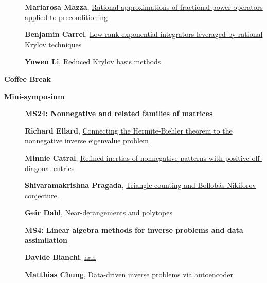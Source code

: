 \documentclass[ILAS2025-program.tex]{subfiles}
\begin{document}
\begin{description}
\begin{description}
        \item[] \hypertarget{up0194}{}\textbf{Mariarosa Mazza}, \hyperlink{down0194}{Rational approximations of fractional power operators applied to preconditioning}
        \item[] \hypertarget{up0195}{}\textbf{Benjamin Carrel}, \hyperlink{down0195}{Low-rank exponential integrators leveraged by rational Krylov techniques
}
        \item[] \hypertarget{up0196}{}\textbf{Yuwen Li}, \hyperlink{down0196}{Reduced Krylov basis methods}
        \end{description}
    \item[\info{15:30\textrm{--}16:00}] \textbf{Coffee Break} 
    \item[\info{16:00\textrm{--}18:00}] \textbf{Mini-symposium} 
    \begin{description}
    \item[] {\color{mstitle}\textbf{MS24: Nonnegative and related families of matrices}} 
    \item[] \hypertarget{up0197}{}\textbf{Richard Ellard}, \hyperlink{down0197}{Connecting the Hermite-Biehler theorem to the nonnegative inverse eigenvalue problem}
        \item[] \hypertarget{up0198}{}\textbf{Minnie Catral}, \hyperlink{down0198}{Refined inertias of nonnegative patterns with positive off-diagonal entries}
        \item[] \hypertarget{up0199}{}\textbf{Shivaramakrishna Pragada}, \hyperlink{down0199}{Triangle counting and Bollob\'{a}s-Nikiforov conjecture.
}
        \item[] \hypertarget{up0200}{}\textbf{Geir Dahl}, \hyperlink{down0200}{Near-derangements and polytopes}
        \end{description}
    \begin{description}
    \item[] {\color{mstitle}\textbf{MS4: Linear algebra methods for inverse problems and data assimilation}} 
    \item[] \hypertarget{up0201}{}\textbf{Davide Bianchi}, \hyperlink{down0201}{nan}
        \item[] \hypertarget{up0202}{}\textbf{Matthias Chung}, \hyperlink{down0202}{Data-driven inverse problems via autoencoder
}
\end{description}
\end{description}
\end{document}
